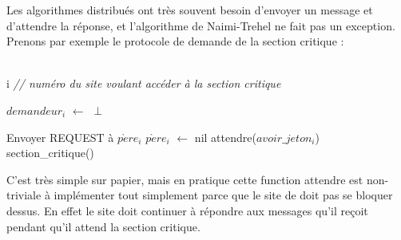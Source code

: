 Les algorithmes distribués ont très souvent besoin d'envoyer un message et d'attendre la réponse, et l'algorithme de Naimi-Trehel ne fait pas un exception. Prenons par exemple le protocole de demande de la section critique :

\begin{algorithm}[H]
  \caption{$Demander_i$()}
  \Donnees
  {\\
    i \textit{// numéro du site voulant accéder à la section critique}\\
  }
  \Deb
  {
  	$demandeur_i$ $\leftarrow$ $\perp$ \;
  	
  	{
  		Envoyer REQUEST à $p\grave{e}re_i$ \;
  		$p\grave{e}re_i$ $\leftarrow$ nil \;
  	}
	attendre($avoir\_jeton_i$) \;
  	section\_critique() \;

  }	
\end{algorithm}

C'est très simple sur papier, mais en pratique cette function \og attendre \fg{} est non-triviale à implémenter tout simplement parce que le site de doit pas se bloquer dessus. En effet le site doit continuer à répondre aux messages qu'il reçoit pendant qu'il attend la section critique.  
